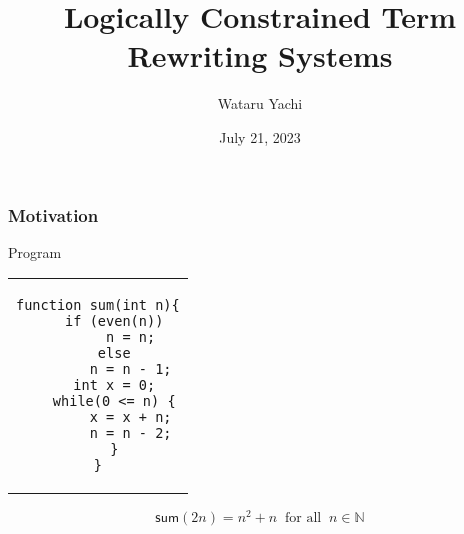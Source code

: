 \documentclass[12pt,aspectratio=169]{beamer}
\title{ Logically Constrained Term Rewriting Systems }
\author{Wataru Yachi}
\institute{JAIST}
\date{July 21, 2023}
\newcommand{\m}[1]{\mathsf{#1}}
\begin{document}
\maketitle

\begin{comment}
\begin{frame}
    \frametitle{If Treat Integers in Rules}

    \begin{example}
        for every $n,m,k \in \mathbb{Z}$
        \begin{tabular}{lcl}
            $\m{add}(\m{m}, \m{n}) \to k$ & if & $k = m + n$ \\
            $\m{even}(\m{n}) \to \m{true}$  & if & $n$ is even number\\
            $\m{even}(\m{n}) \to \m{false}$ & if & $n$ is not even number
            \end{tabular}
    \end{example}
\end{frame}
\end{comment}

\begin{frame}[fragile]
    \frametitle{Motivation}

    Program
\begin{center}
\begin{tabular}{c}
\begin{lstlisting}
function sum(int n){
    if (even(n))
        n = n;
    else
        n = n - 1;
    int x = 0;
    while(0 <= n) {
        x = x + n;
        n = n - 2;
    }
}
\end{lstlisting}
\end{tabular}
\end{center}
    \[
        \m{sum}(2n) = n^2 + n \;\; \text{for all} \;\; n \in \mathbb{N}
    \]
\end{frame}
\end{document}
